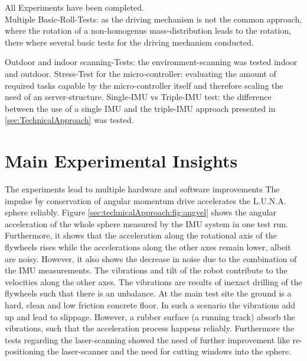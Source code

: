 \documentclass[graybox]{svmono}
\newcommand{\1}{\mathbbm{1}}                 %
\begin{document}
All Experiments have been completed.\\

Multiple Basic-Roll-Tests: as the driving mechanism is not the common approach, where the rotation of a non-homogenus mass-distribution leads to the rotation, there where several basic tests for the driving mechanism conducted. \newline


Outdoor and indoor scanning-Tests: the environment-scanning was tested indoor and outdoor. 
\newline
Stress-Test for the micro-controller: evaluating the amount of required tasks capable by the micro-controller itself  and therefore scaling the need of an server-structure. \newline
Single-IMU vs Triple-IMU test: the difference between the use of a single IMU and the triple-IMU approach presented in 
\ref{sec:TechnicalApproach}  was tested.
\newpage


\section{Main Experimental Insights}

The experiments lead to multiple hardware and software improvements
The impulse by conservation of angular momentum drive accelerates the L.U.N.A. sphere reliably.
Figure \ref{sec:technicalApproach:fig:angvel} shows the angular acceleration of the whole sphere measured by the IMU system in one test run. 
Furthermore, it shows that the acceleration along the rotational axis of the flywheels rises while the accelerations along the other axes remain lower, albeit are noisy. 
However, it also shows the decrease in noise due to the combination of the IMU measurements.
The vibrations and tilt of the robot contribute to the velocities along the other axes.
The vibrations are results of inexact drilling of the flywheels such that there is an unbalance.
At the main test site the ground is a hard, clean and low friction concrete floor.
In such a scenario the vibrations add up and lead to slippage.
However, a rubber surface (a running track) absorb the vibrations, such that the acceleration process happens reliably.\newline
Furthermore the tests regarding the laser-scanning showed the need of further improvement like re-positioning the laser-scanner and the need for cutting windows into the sphere.
\end{document}
